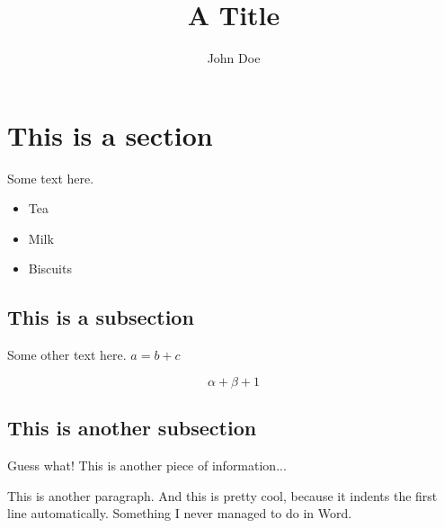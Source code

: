 \documentclass{article}
\title{A Title}
\author{John Doe}
\begin{document}
\maketitle

\section{This is a section}

Some text here.

\begin{itemize}
    \item Tea
    \item Milk
    \item Biscuits
\end{itemize}

\subsection{This is a subsection}

Some other text here. $a = b + c$

\begin{equation}
    \alpha + \beta + 1
\end{equation}

\subsection{This is another subsection}

Guess what!
This is another piece of information...

This is another paragraph. And this is pretty cool, because
it indents the first line automatically. Something I never
managed to do in Word.
\end{document}
